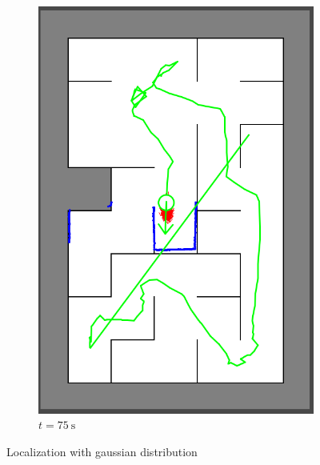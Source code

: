 \begin{figure}[H]
\begin{subfigure}{0.2\textwidth}
         \includegraphics[width=\textwidth]{figures/localization2_75s.png}
         \caption{$t = \SI{75}{\second}$}
         \label{mapping20s}
     \end{subfigure}
        \caption{Localization with gaussian distribution}
        \label{fig:three graphs}
\end{figure}